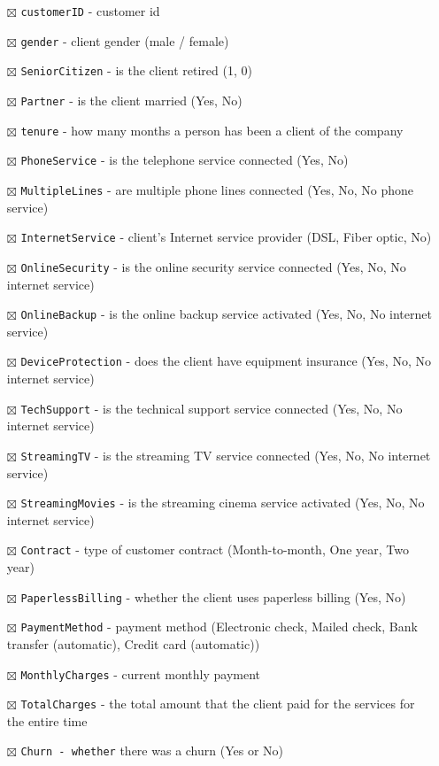 \documentclass[
  letterpaper,
  DIV=11,
  numbers=noendperiod]{scrreprt}
\providecommand{\tightlist}{%
  \setlength{\itemsep}{0pt}\setlength{\parskip}{0pt}}\usepackage{longtable,booktabs,array}
\begin{document}
\begin{itemize}
\tightlist
\item[$\boxtimes$]
  \texttt{customerID} - customer id
\item[$\boxtimes$]
  \texttt{gender} - client gender (male / female)
\item[$\boxtimes$]
  \texttt{SeniorCitizen} - is the client retired (1, 0)
\item[$\boxtimes$]
  \texttt{Partner} - is the client married (Yes, No)
\item[$\boxtimes$]
  \texttt{tenure} - how many months a person has been a client of the
  company
\item[$\boxtimes$]
  \texttt{PhoneService} - is the telephone service connected (Yes, No)
\item[$\boxtimes$]
  \texttt{MultipleLines} - are multiple phone lines connected (Yes, No,
  No phone service)
\item[$\boxtimes$]
  \texttt{InternetService} - client's Internet service provider (DSL,
  Fiber optic, No)
\item[$\boxtimes$]
  \texttt{OnlineSecurity} - is the online security service connected
  (Yes, No, No internet service)
\item[$\boxtimes$]
  \texttt{OnlineBackup} - is the online backup service activated (Yes,
  No, No internet service)
\item[$\boxtimes$]
  \texttt{DeviceProtection} - does the client have equipment insurance
  (Yes, No, No internet service)
\item[$\boxtimes$]
  \texttt{TechSupport} - is the technical support service connected
  (Yes, No, No internet service)
\item[$\boxtimes$]
  \texttt{StreamingTV} - is the streaming TV service connected (Yes, No,
  No internet service)
\item[$\boxtimes$]
  \texttt{StreamingMovies} - is the streaming cinema service activated
  (Yes, No, No internet service)
\item[$\boxtimes$]
  \texttt{Contract} - type of customer contract (Month-to-month, One
  year, Two year)
\item[$\boxtimes$]
  \texttt{PaperlessBilling} - whether the client uses paperless billing
  (Yes, No)
\item[$\boxtimes$]
  \texttt{PaymentMethod} - payment method (Electronic check, Mailed
  check, Bank transfer (automatic), Credit card (automatic))
\item[$\boxtimes$]
  \texttt{MonthlyCharges} - current monthly payment
\item[$\boxtimes$]
  \texttt{TotalCharges} - the total amount that the client paid for the
  services for the entire time
\item[$\boxtimes$]
  \texttt{Churn\ -\ whether} there was a churn (Yes or No)
\end{itemize}
\end{document}
